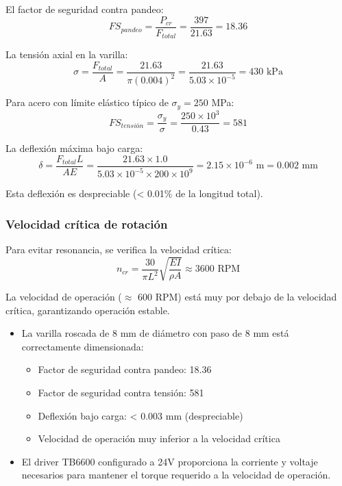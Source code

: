 El factor de seguridad contra pandeo:
\begin{equation}
FS_{pandeo} = \frac{P_{cr}}{F_{total}} = \frac{397}{21.63} = 18.36
\end{equation}

La tensión axial en la varilla:
\begin{equation}
\sigma = \frac{F_{total}}{A} = \frac{21.63}{\pi (0.004)^2} = \frac{21.63}{5.03 \times 10^{-5}} = 430 \text{ kPa}
\end{equation}

Para acero con límite elástico típico de $\sigma_y = 250$ MPa:
\begin{equation}
FS_{tensión} = \frac{\sigma_y}{\sigma} = \frac{250 \times 10^3}{0.43} = 581
\end{equation}

La deflexión máxima bajo carga:
\begin{equation}
\delta = \frac{F_{total} L}{A E} = \frac{21.63 \times 1.0}{5.03 \times 10^{-5} \times 200 \times 10^9} = 2.15 \times 10^{-6} \text{ m} = 0.002 \text{ mm}
\end{equation}

Esta deflexión es despreciable (< 0.01\% de la longitud total).

\subsubsection{Velocidad crítica de rotación}
Para evitar resonancia, se verifica la velocidad crítica:
\begin{equation}
n_{cr} = \frac{30}{\pi L^2} \sqrt{\frac{E I}{\rho A}} \approx 3600 \text{ RPM}
\end{equation}

La velocidad de operación ($\approx$ 600 RPM) está muy por debajo de la velocidad crítica, garantizando operación estable.

\begin{itemize}
    \item La varilla roscada de 8 mm de diámetro con paso de 8 mm está correctamente dimensionada:
    \begin{itemize}
        \item Factor de seguridad contra pandeo: 18.36
        \item Factor de seguridad contra tensión: 581
        \item Deflexión bajo carga: < 0.003 mm (despreciable)
        \item Velocidad de operación muy inferior a la velocidad crítica
    \end{itemize}
    \item El driver TB6600 configurado a 24V proporciona la corriente y voltaje necesarios para mantener el torque requerido a la velocidad de operación.
\end{itemize}
